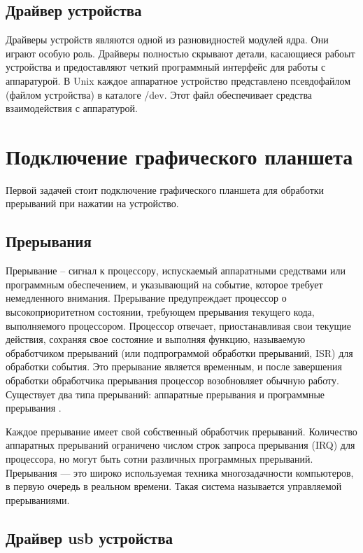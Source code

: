\subsection{Драйвер устройства}

Драйверы устройств являются одной из разновидностей модулей ядра. Они играют особую роль. Драйверы полностью скрывают детали, касающиеся рабоыт устройства и предоставляют четкий программный интерфейс для работы с аппаратурой. В Unix каждое аппаратное устройство представлено псевдофайлом (файлом устройства) в каталоге /dev. Этот файл обеспечивает средства взаимодействия с аппаратурой.

\section{Подключение графического планшета}

Первой задачей стоит подключение графического планшета для обработки прерываний при нажатии на устройство.

\subsection{Прерывания}

Прерывание -- сигнал к процессору, испускаемый аппаратными средствами или программным обеспечением, и указывающий на событие, которое требует немедленного внимания. Прерывание предупреждает процессор о высокоприоритетном состоянии, требующем прерывания текущего кода, выполняемого процессором. Процессор отвечает, приостанавливая свои текущие действия, сохраняя свое состояние и выполняя функцию, называемую обработчиком прерываний (или подпрограммой обработки прерываний, ISR) для обработки события. Это прерывание является временным, и после завершения обработки обработчика прерывания процессор возобновляет обычную работу. Существует два типа прерываний: аппаратные прерывания и программные прерывания \cite{Interrupts}.

Каждое прерывание имеет свой собственный обработчик прерываний. Количество аппаратных прерываний ограничено числом строк запроса прерывания (IRQ) для процессора, но могут быть сотни различных программных прерываний. Прерывания — это широко используемая техника многозадачности компьютеров, в первую очередь в реальном времени. Такая система называется управляемой прерываниями.

\subsection{Драйвер usb устройства}

